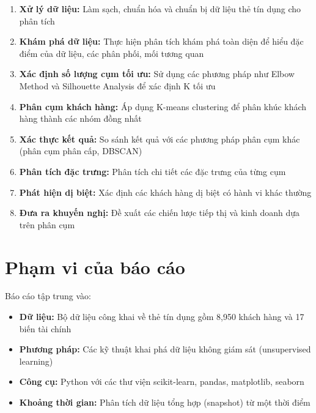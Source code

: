 \begin{enumerate}
    \item \textbf{Xử lý dữ liệu:} Làm sạch, chuẩn hóa và chuẩn bị dữ liệu thẻ tín dụng cho phân tích
    
    \item \textbf{Khám phá dữ liệu:} Thực hiện phân tích khám phá toàn diện để hiểu đặc điểm của dữ liệu, các phân phối, mối tương quan
    
    \item \textbf{Xác định số lượng cụm tối ưu:} Sử dụng các phương pháp như Elbow Method và Silhouette Analysis để xác định K tối ưu
    
    \item \textbf{Phân cụm khách hàng:} Áp dụng K-means clustering để phân khúc khách hàng thành các nhóm đồng nhất
    
    \item \textbf{Xác thực kết quả:} So sánh kết quả với các phương pháp phân cụm khác (phân cụm phân cấp, DBSCAN)
    
    \item \textbf{Phân tích đặc trưng:} Phân tích chi tiết các đặc trưng của từng cụm
    
    \item \textbf{Phát hiện dị biệt:} Xác định các khách hàng dị biệt có hành vi khác thường
    
    \item \textbf{Đưa ra khuyến nghị:} Đề xuất các chiến lược tiếp thị và kinh doanh dựa trên phân cụm
\end{enumerate}

\section{Phạm vi của báo cáo}

Báo cáo tập trung vào:

\begin{itemize}
    \item \textbf{Dữ liệu:} Bộ dữ liệu công khai về thẻ tín dụng gồm 8,950 khách hàng và 17 biến tài chính
    \item \textbf{Phương pháp:} Các kỹ thuật khai phá dữ liệu không giám sát (unsupervised learning)
    \item \textbf{Công cụ:} Python với các thư viện scikit-learn, pandas, matplotlib, seaborn
    \item \textbf{Khoảng thời gian:} Phân tích dữ liệu tổng hợp (snapshot) từ một thời điểm
\end{itemize}

